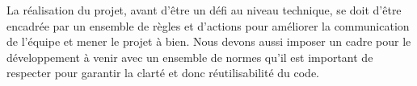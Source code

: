 \hspace{3em}
La réalisation du projet, avant d’être un défi au niveau technique, se doit d’être encadrée par un ensemble de règles et d’actions pour améliorer la communication de
l’équipe et mener le projet à bien. Nous devons aussi imposer un cadre pour le développement à venir avec un ensemble de normes qu’il est important de respecter pour
garantir la clarté et donc réutilisabilité du code.
